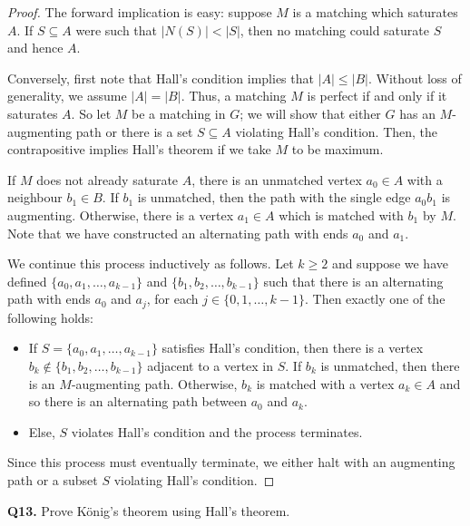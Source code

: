 \documentclass{article}
\begin{document}
\begin{proof}
The forward implication is easy: suppose \( M \) is a matching which saturates \( A \). If \( S \subseteq A \)  were such that \( |N(S)| < |S| \), then no matching could saturate \( S \) and hence \( A \).

Conversely, first note that Hall's condition implies that \( |A| \leq |B|\). Without loss of generality, we assume \( |A| = |B| \). Thus, a matching \( M \) is perfect if and only if it saturates \( A \). So let \( M \) be a matching in \( G \); we will show that either \( G \) has an \( M \)-augmenting path or there is a set \( S \subseteq A \) violating Hall's condition. Then, the contrapositive implies Hall's theorem if we take \( M \) to be maximum.

If \( M \) does not already saturate \( A \), there is an unmatched vertex \( a_0 \in A \) with a neighbour \( b_1 \in B \). If \( b_1 \) is unmatched, then the path with the single edge \( a_0b_1 \) is augmenting. Otherwise, there is a vertex \( a_1 \in A \) which is matched with \( b_1 \) by \( M \). Note that we have constructed an alternating path with ends \( a_0 \) and \( a_1 \). 

We continue this process inductively as follows. Let \( k \geq 2 \) and suppose we have defined \( \{ a_0, a_1, \hdots , a_{k - 1}  \}  \) and \( \{ b_1, b_2, \hdots , b_{k - 1}  \}  \) such that there is an alternating path with ends \( a_0 \) and \( a_{j}  \), for each \( j \in \{ 0, 1, \hdots ,k-1 \}  \). Then exactly one of the following holds:
\begin{itemize}[nolistsep]
	\item If \( S = \{ a_0, a_1, \hdots , a_{k-1}  \}  \) satisfies Hall's condition, then there is a vertex \( b_{k} \notin \{ b_1, b_2, \hdots ,b_{k-1}  \}   \) adjacent to a vertex in \( S \). If \( b_{k}  \) is unmatched, then there is an \( M \)-augmenting path. Otherwise, \( b_{k}  \) is matched with a vertex \( a_{k} \in A \) and so there is an alternating path between \( a_0 \) and \( a_{k}  \).
	\item Else, \( S \) violates Hall's condition and the process terminates.
\end{itemize}
Since this process must eventually terminate, we either halt with an augmenting path or a subset \( S \) violating Hall's condition.
\end{proof}
\noindent \textbf{Q13.} Prove K\"onig's theorem using Hall's theorem.
\end{document}
